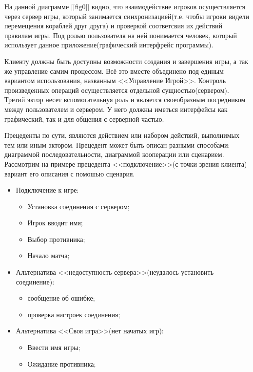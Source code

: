 На данной диаграмме [\ref{fig0}] видно, что взаимодействие игроков осуществляется через сервер игры, который
занимается синхронизацией(т.е. чтобы игроки видели перемещения кораблей друг друга)
и проверкой соответсвия их действий правилам игры. Под ролью пользователя на ней понимается 
человек, который использует данное приложение(графический интерфрейс программы).

Клиенту должны быть доступны возможности создания и завершения игры, а так же управление самим процессом. Всё это вместе объединено под единым вариантом использования, названным <<Управление Игрой>>. Контроль произведенных операций осуществляется отдельной сущностью(сервером). Третий эктор несет вспомогательнуя роль и является своеобразным посредником между пользователем и сервером. У него должны иметься интерфейсы как графический, так и для общения с серверной частью. 

Прецеденты по сути, являются действием или набором действий, выполнимых тем или иным эктором. Прецедент может быть описан разными способами: диаграммой последовательности, диаграммой кооперации или сценарием.
Рассмотрим на примере прецедента <<подключение>>(с точки зрения клиента) вариант его описания с помошью сценария.

\begin{itemize}
	\item Подключение к игре:
	\begin{itemize}
		\item Установка соединения с сервером;
		\item Игрок вводит имя;
		\item Выбор противника;
		\item Начало матча;
  	\end{itemize} 
	\item Альтернатива <<недоступность сервера>>(неудалось установить соединение): 
	\begin{itemize}
		\item сообщение об ошибке;
		\item проверка настроек соединения;
  	\end{itemize} 
	\item Альтернатива <<Своя игра>>(нет начатых игр):
	\begin{itemize}
		\item Ввести имя игры;
		\item Ожидание противника;
  	\end{itemize} 
\end{itemize} 

